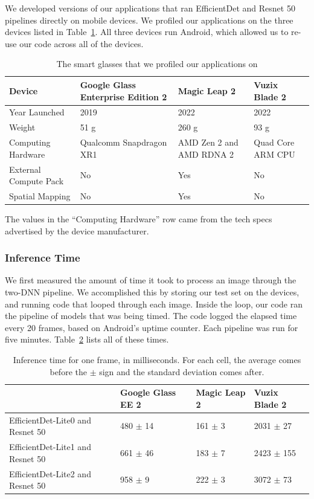 We developed versions of our applications that ran EfficientDet and Resnet 50
pipelines directly on mobile devices.
We profiled our applications on the three devices listed in
Table~\ref{tab:devices}.
All three devices run Android, which allowed us to re-use our code across all of
the devices.

\begin{table}
\begin{tabular}{|l||p{3.5cm}|p{3.5cm}|p{3.5cm}|}
  \hline
  Device & Google Glass Enterprise Edition 2 & Magic Leap 2 & Vuzix Blade 2\\
  \hline
  \hline
  Year Launched & 2019 & 2022 & 2022\\
  Weight & 51 g & 260 g & 93 g\\
  Computing Hardware & Qualcomm Snapdragon XR1 & AMD Zen 2 and AMD RDNA 2 & Quad Core ARM CPU\\
  External Compute Pack & No & Yes & No\\
  Spatial Mapping & No & Yes & No\\
  \hline
\end{tabular}
  \begin{captiontext}
    The values in the
    ``Computing Hardware'' row came from the tech specs advertised by the device
    manufacturer.
  \end{captiontext}
  \caption{
    The smart glasses that we profiled our applications on
  }\label{tab:devices}
\end{table}

\subsubsection{Inference Time}\label{sec:mobile_inf_time}

We first measured the amount of time it took to process an image through the
two-DNN pipeline.
We accomplished this by storing our test set on the devices, and running code
that looped through each image.
Inside the loop, our code ran the pipeline of models that was being timed.
The code logged the elapsed time every 20 frames, based on Android's uptime
counter.
Each pipeline was run for five minutes.
Table~\ref{tab:mobile_inference} lists all of these times.

\begin{table}
\begin{tabular}{|l||l|l|l|}
  \hline
  & Google Glass EE 2 & Magic Leap 2 & Vuzix Blade 2\\
  \hline
  \hline
  EfficientDet-Lite0 and Resnet 50 & 480 $\pm$ 14 & 161 $\pm$ 3 & 2031 $\pm$ 27\\
  EfficientDet-Lite1 and Resnet 50 & 661 $\pm$ 46 & 183 $\pm$ 7 & 2423 $\pm$ 155\\
  EfficientDet-Lite2 and Resnet 50 & 958 $\pm$ 9 & 222 $\pm$ 3 & 3072 $\pm$ 73\\
  \hline
\end{tabular}
  \caption{
    Inference time for one frame, in milliseconds.
    For each cell, the average comes before the $\pm$ sign and the standard
    deviation comes after.
  }\label{tab:mobile_inference}
\end{table}

